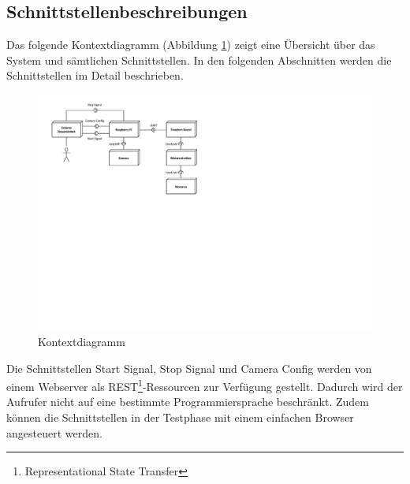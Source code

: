 \subsection{Schnittstellenbeschreibungen}
Das folgende Kontextdiagramm (Abbildung \ref{fig:kontextdiagramm}) zeigt eine Übersicht über das System und sämtlichen Schnittstellen. In den folgenden Abschnitten werden die Schnittstellen im Detail beschrieben.

\begin{figure}[h!]
	\centering
	\includegraphics[width=0.9\linewidth]{../../fig/kontextdiagramm}
	\caption{Kontextdiagramm}
	\label{fig:kontextdiagramm}
\end{figure}

Die Schnittstellen Start Signal, Stop Signal und Camera Config werden von einem Webserver als REST\footnote{Representational State Transfer}-Ressourcen zur Verfügung gestellt. Dadurch wird der Aufrufer nicht auf eine bestimmte Programmiersprache beschränkt. Zudem können die Schnittstellen in der Testphase mit einem einfachen Browser angesteuert werden.





\newpage



\newpage







